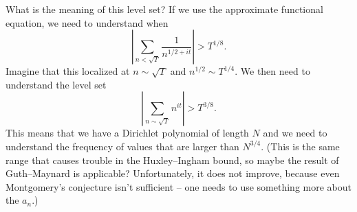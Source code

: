 \documentclass[reqno]{amsart} 
\numberwithin{theorem}{section}
\numberwithin{equation}{section}
\begin{document}
What is the meaning of this level set?  If we use the approximate functional equation, we need to understand when
\begin{equation*}
  \left\lvert \sum_{n < \sqrt{T}} \frac{1}{ n^{1/2 + i t}} \right\rvert > T^{1/8}.
\end{equation*}
Imagine that this localized at $n \sim \sqrt{T}$ and $n^{1/2} \sim T^{1/4}$.  We then need to understand the level set
\begin{equation*}
  \left\lvert \sum_{n \sim \sqrt{T}} n^{i t} \right\rvert > T^{3/8}.
\end{equation*}
This means that we have a Dirichlet polynomial of length $N$ and we need to understand the frequency of values that are larger than $N^{3/4}$.  (This is the same range that causes trouble in the Huxley--Ingham bound, so maybe the result of Guth--Maynard is applicable?  Unfortunately, it does not improve, because even Montgomery's conjecture isn't sufficient -- one needs to use something more about the $a_n$.)
\end{document}
